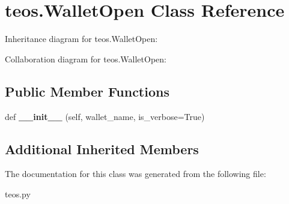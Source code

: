 \hypertarget{classteos_1_1WalletOpen}{}\section{teos.\+Wallet\+Open Class Reference}
\label{classteos_1_1WalletOpen}


Inheritance diagram for teos.\+Wallet\+Open\+:


Collaboration diagram for teos.\+Wallet\+Open\+:
\subsection*{Public Member Functions}
\begin{DoxyCompactItemize}
\item 
\mbox{\label{classteos_1_1WalletOpen_a23bbd7488eee518925d4dd24add9768d}} 
def {\bfseries \+\_\+\+\_\+init\+\_\+\+\_\+} (self, wallet\+\_\+name, is\+\_\+verbose=True)
\end{DoxyCompactItemize}
\subsection*{Additional Inherited Members}


The documentation for this class was generated from the following file\+:\begin{DoxyCompactItemize}
\item 
teos.\+py\end{DoxyCompactItemize}
